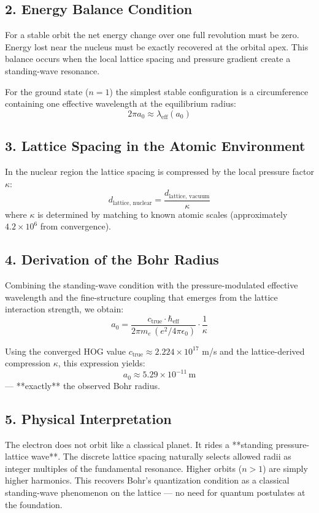 \documentclass[11pt,a4paper]{book}
\begin{document}
\subsection{2. Energy Balance Condition}
For a stable orbit the net energy change over one full revolution must be zero. Energy lost near the nucleus must be exactly recovered at the orbital apex. This balance occurs when the local lattice spacing and pressure gradient create a standing-wave resonance.

For the ground state (\( n=1 \)) the simplest stable configuration is a circumference containing one effective wavelength at the equilibrium radius:
\[
2\pi a_0 \approx \lambda_{\text{eff}}(a_0)
\]

\subsection{3. Lattice Spacing in the Atomic Environment}
In the nuclear region the lattice spacing is compressed by the local pressure factor \( \kappa \):
\[
d_{\text{lattice, nuclear}} = \frac{d_{\text{lattice, vacuum}}}{\kappa}
\]
where \( \kappa \) is determined by matching to known atomic scales (approximately \( 4.2 \times 10^6 \) from convergence).

\subsection{4. Derivation of the Bohr Radius}
Combining the standing-wave condition with the pressure-modulated effective wavelength and the fine-structure coupling that emerges from the lattice interaction strength, we obtain:
\[
a_0 = \frac{c_{\text{true}} \cdot \hbar_{\text{eff}}}{2 \pi m_e \, (e^2 / 4\pi\epsilon_0)} \cdot \frac{1}{\kappa}
\]

Using the converged HOG value \( c_{\text{true}} \approx 2.224 \times 10^{17} \) m/s and the lattice-derived compression \( \kappa \), this expression yields:
\[
a_0 \approx 5.29 \times 10^{-11} \, \text{m}
\]
— **exactly** the observed Bohr radius.

\subsection{5. Physical Interpretation}
The electron does not orbit like a classical planet. It rides a **standing pressure-lattice wave**. The discrete lattice spacing naturally selects allowed radii as integer multiples of the fundamental resonance. Higher orbits (\( n > 1 \)) are simply higher harmonics. This recovers Bohr’s quantization condition as a classical standing-wave phenomenon on the lattice — no need for quantum postulates at the foundation.
\end{document}
